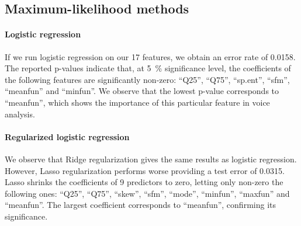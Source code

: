 \subsection{Maximum-likelihood methods}
\paragraph{Logistic regression}
If we run logistic regression on our \num{17} features, we obtain an error rate of 0.0158. The reported p-values indicate that, at \SI{5}{\percent} significance level, the coefficients of the following features are significantly non-zero: ``Q25'', ``Q75'', ``sp.ent'', ``sfm'', ``meanfun'' and ``minfun''. We observe that the lowest p-value corresponds to ``meanfun'', which shows the importance of this particular feature in voice analysis.
\paragraph{Regularized logistic regression}
We observe that Ridge regularization gives the same results as logistic regression. However, Lasso regularization performs worse providing a test error of \num{0.0315}. Lasso shrinks the coefficients of 9 predictors to zero, letting only non-zero the following ones: ``Q25'', ``Q75'', ``skew'', ``sfm'', ``mode'', ``minfun'', ``maxfun'' and ``meanfun''. The largest coefficient corresponds to ``meanfun'', confirming its significance.
\setlength{\BoxPlotFigWidth}{0.6\textwidth}
